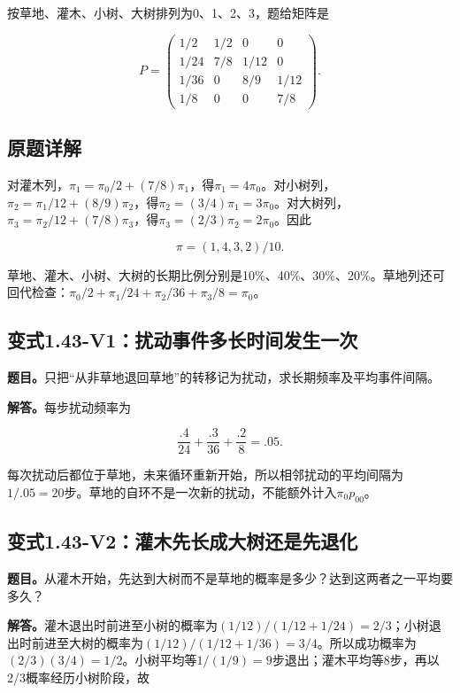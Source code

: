 \documentclass[
  11pt,
  a4paper,
  UTF8,
  fontset=fandol]{ctexart}
\begin{document}
按草地、灌木、小树、大树排列为0、1、2、3，题给矩阵是

\[
P=\begin{pmatrix}
1/2&1/2&0&0\\1/24&7/8&1/12&0\\1/36&0&8/9&1/12\\1/8&0&0&7/8
\end{pmatrix}.
\]

\subsection{原题详解}\label{ux539fux9898ux8be6ux89e3-9}

对灌木列，\(\pi_1=\pi_0/2+(7/8)\pi_1\)，得\(\pi_1=4\pi_0\)。对小树列，\(\pi_2=\pi_1/12+(8/9)\pi_2\)，得\(\pi_2=(3/4)\pi_1=3\pi_0\)。对大树列，\(\pi_3=\pi_2/12+(7/8)\pi_3\)，得\(\pi_3=(2/3)\pi_2=2\pi_0\)。因此

\[
\boxed{\pi=(1,4,3,2)/10.}
\]

草地、灌木、小树、大树的长期比例分别是10\%、40\%、30\%、20\%。草地列还可回代检查：\(\pi_0/2+\pi_1/24+\pi_2/36+\pi_3/8=\pi_0\)。

\subsection{变式1.43-V1：扰动事件多长时间发生一次}\label{ux53d8ux5f0f1.43-v1ux6270ux52a8ux4e8bux4ef6ux591aux957fux65f6ux95f4ux53d1ux751fux4e00ux6b21}

\textbf{题目。}只把``从非草地退回草地''的转移记为扰动，求长期频率及平均事件间隔。

\textbf{解答。}每步扰动频率为

\[
\frac{.4}{24}+\frac{.3}{36}+\frac{.2}{8}=.05.
\]

每次扰动后都位于草地，未来循环重新开始，所以相邻扰动的平均间隔为\(1/.05=20\)步。草地的自环不是一次新的扰动，不能额外计入\(\pi_0p_{00}\)。

\subsection{变式1.43-V2：灌木先长成大树还是先退化}\label{ux53d8ux5f0f1.43-v2ux704cux6728ux5148ux957fux6210ux5927ux6811ux8fd8ux662fux5148ux9000ux5316}

\textbf{题目。}从灌木开始，先达到大树而不是草地的概率是多少？达到这两者之一平均要多久？

\textbf{解答。}灌木退出时前进至小树的概率为\((1/12)/(1/12+1/24)=2/3\)；小树退出时前进至大树的概率为\((1/12)/(1/12+1/36)=3/4\)。所以成功概率为\((2/3)(3/4)=1/2\)。小树平均等\(1/(1/9)=9\)步退出；灌木平均等8步，再以2/3概率经历小树阶段，故
\end{document}
